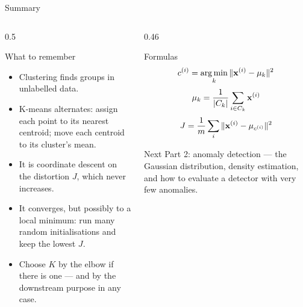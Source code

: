 \documentclass[aspectratio=169,10pt]{beamer}
\begin{document}
\begin{frame}{Summary}
  \begin{columns}[T,onlytextwidth]
    \begin{column}{0.5\textwidth}
      \begin{block}{What to remember}
        \footnotesize
        \begin{itemize}
          \item Clustering finds groups in unlabelled data.
          \item K-means alternates: assign each point to its nearest centroid; move each
                centroid to its cluster's mean.
          \item It is coordinate descent on the distortion $J$, which never increases.
          \item It converges, but possibly to a local minimum: run many random
                initialisations and keep the lowest $J$.
          \item Choose $K$ by the elbow if there is one --- and by the downstream purpose
                in any case.
        \end{itemize}
      \end{block}
    \end{column}
    \begin{column}{0.46\textwidth}
      \begin{block}{Formulas}
        \[ c^{(i)}=\operatorname*{arg\,min}_k\|\mathbf{x}^{(i)}-\mu_k\|^2 \]
        \[ \mu_k=\frac{1}{|C_k|}\sum_{i\in C_k}\mathbf{x}^{(i)} \]
        \[ J=\frac1m\sum_i\|\mathbf{x}^{(i)}-\mu_{c^{(i)}}\|^2 \]
      \end{block}
      \begin{block}{Next}
        \footnotesize Part 2: anomaly detection --- the Gaussian distribution, density
        estimation, and how to evaluate a detector with very few anomalies.
      \end{block}
    \end{column}
  \end{columns}
\end{frame}
\end{document}
